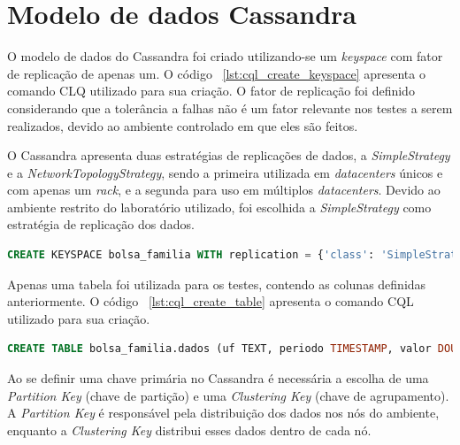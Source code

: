 \section{Modelo de dados Cassandra}
O modelo de dados do Cassandra foi criado utilizando-se um \emph{keyspace} com fator de replicação de apenas um. O código ~\ref{lst:cql_create_keyspace} apresenta o comando CLQ utilizado para sua criação. O fator de replicação foi definido considerando que a tolerância a falhas não é um fator relevante nos testes a serem realizados, devido ao ambiente controlado em que eles são feitos.

O Cassandra apresenta duas estratégias de replicações de dados, a \emph{SimpleStrategy} e a \emph{NetworkTopologyStrategy}, sendo a primeira utilizada em \emph{datacenters} únicos e com apenas um \emph{rack}, e a segunda para uso em múltiplos \emph{datacenters}. Devido ao ambiente restrito do laboratório utilizado, foi escolhida a \emph{SimpleStrategy} como estratégia de replicação dos dados.

\noindent
\begin{minipage}[c]{1\textwidth}
\begin{lstlisting}[caption={Código CQL para criação do keyspace},label={lst:cql_create_keyspace},language=SQL]
CREATE KEYSPACE bolsa_familia WITH replication = {'class': 'SimpleStrategy', 'replication_factor': 1};
\end{lstlisting}
\end{minipage}

Apenas uma tabela foi utilizada para os testes, contendo as colunas definidas anteriormente. O código ~\ref{lst:cql_create_table} apresenta o comando CQL utilizado para sua criação.

\noindent
\begin{minipage}[c]{1\textwidth}
	\begin{lstlisting}[caption={Código CQL para criação da tabela},label={lst:cql_create_table},language=SQL]
	CREATE TABLE bolsa_familia.dados (uf TEXT, periodo TIMESTAMP, valor DOUBLE, nis_favorecido BIGINT, cod_municipio INT, fonte TEXT, nome_favorecido TEXT, nome_municipio TEXT, PRIMARY KEY(nis_favorecido, periodo, valor));
	\end{lstlisting}
\end{minipage}

Ao se definir uma chave primária no Cassandra é necessária a escolha de uma \emph{Partition Key} (chave de partição) e uma \emph{Clustering Key} (chave de agrupamento). A \emph{Partition Key} é responsável pela distribuição dos dados nos nós do ambiente, enquanto a \emph{Clustering Key} distribui esses dados dentro de cada nó.

